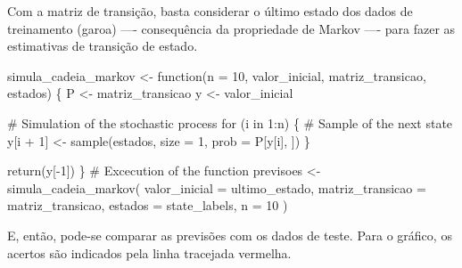 \documentclass[
  letterpaper,
  DIV=11,
  numbers=noendperiod]{scrreprt}
\newenvironment{Shaded}{\begin{snugshade}}{\end{snugshade}}
\newcommand{\AttributeTok}[1]{\textcolor[rgb]{0.40,0.45,0.13}{#1}}
\newcommand{\CommentTok}[1]{\textcolor[rgb]{0.37,0.37,0.37}{#1}}
\newcommand{\ControlFlowTok}[1]{\textcolor[rgb]{0.00,0.23,0.31}{#1}}
\newcommand{\DecValTok}[1]{\textcolor[rgb]{0.68,0.00,0.00}{#1}}
\newcommand{\FunctionTok}[1]{\textcolor[rgb]{0.28,0.35,0.67}{#1}}
\newcommand{\NormalTok}[1]{\textcolor[rgb]{0.00,0.23,0.31}{#1}}
\newcommand{\OtherTok}[1]{\textcolor[rgb]{0.00,0.23,0.31}{#1}}
\newcommand{\SpecialCharTok}[1]{\textcolor[rgb]{0.37,0.37,0.37}{#1}}
\begin{document}

Com a matriz de transição, basta considerar o último estado dos dados de
treinamento (garoa) ---- consequência da propriedade de Markov ---- para
fazer as estimativas de transição de estado.

\begin{Shaded}
\begin{Highlighting}[]
\NormalTok{simula\_cadeia\_markov }\OtherTok{\textless{}{-}} \ControlFlowTok{function}\NormalTok{(}\AttributeTok{n =} \DecValTok{10}\NormalTok{,}
\NormalTok{                                 valor\_inicial,}
\NormalTok{                                 matriz\_transicao,}
\NormalTok{                                 estados) \{}
\NormalTok{    P }\OtherTok{\textless{}{-}}\NormalTok{ matriz\_transicao}
\NormalTok{    y }\OtherTok{\textless{}{-}}\NormalTok{ valor\_inicial}

    \CommentTok{\# Simulation of the stochastic process}
    \ControlFlowTok{for}\NormalTok{ (i }\ControlFlowTok{in} \DecValTok{1}\SpecialCharTok{:}\NormalTok{n) \{}
        \CommentTok{\# Sample of the next state}
\NormalTok{        y[i }\SpecialCharTok{+} \DecValTok{1}\NormalTok{] }\OtherTok{\textless{}{-}} \FunctionTok{sample}\NormalTok{(estados, }\AttributeTok{size =} \DecValTok{1}\NormalTok{, }\AttributeTok{prob =}\NormalTok{ P[y[i], ])}
\NormalTok{    \}}

    \FunctionTok{return}\NormalTok{(y[}\SpecialCharTok{{-}}\DecValTok{1}\NormalTok{])}
\NormalTok{\}}
\CommentTok{\# Excecution of the function}
\NormalTok{previsoes }\OtherTok{\textless{}{-}} \FunctionTok{simula\_cadeia\_markov}\NormalTok{(}
    \AttributeTok{valor\_inicial    =}\NormalTok{ ultimo\_estado,}
    \AttributeTok{matriz\_transicao =}\NormalTok{ matriz\_transicao,}
    \AttributeTok{estados          =}\NormalTok{ state\_labels,}
    \AttributeTok{n                =} \DecValTok{10}
\NormalTok{)}
\end{Highlighting}
\end{Shaded}

E, então, pode-se comparar as previsões com os dados de teste. Para o
gráfico, os acertos são indicados pela linha tracejada vermelha.

\begin{Shaded}
\end{Shaded}
\end{document}
